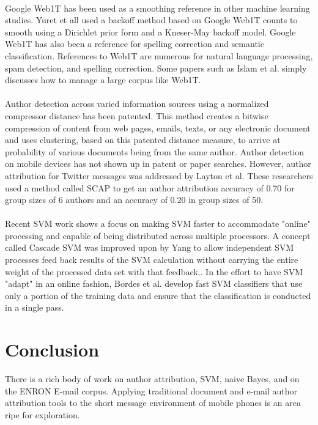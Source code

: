 	\paragraph{} Google Web1T has been used as a smoothing reference in other machine learning studies.  Yuret et all used a backoff method based on Google Web1T counts to smooth using a Dirichlet prior form and a Kneser-May backoff model.\cite{yuret_smoothing_2008} Google Web1T has also been a reference for spelling correction\cite{islam_real-word_2009} and semantic classification\cite{o_seaghdha_semantic_2008}.  References to Web1T are numerous for natural language processing, spam detection, and spelling correction.  Some papers such as Islam et al. simply discusses how to manage a large corpus like Web1T.\cite{islam_managing_2009}
	\paragraph{} Author detection across varied information sources using a normalized compressor distance has been patented.  This method creates a bitwise compression of content from web pages, emails, texts, or any electronic document and uses clustering, based on this patented distance measure, to arrive at probability of various  documents being from the same author.\cite{_method_????}  Author detection on mobile devices has not shown up in patent or paper searches.  However, author attribution for Twitter messages was addressed by Layton et al. These researchers used a method called SCAP to get an author attribution accuracy of 0.70 for group sizes of 6 authors and an accuracy of 0.20 in group sizes of 50.\cite{layton_authorship_2010}
	\paragraph{} Recent SVM work shows a focus on making SVM faster to accommodate "online" processing and capable of being distributed across multiple processors.  A concept called Cascade SVM was improved upon by Yang to allow independent SVM processes feed back results of the SVM calculation without carrying the entire weight of the processed data set with that feedback.\cite{yang_improved_2006}.  In the effort to have SVM "adapt" in an online fashion, Bordes et al. develop fast SVM classifiers that use only a portion of the training data and ensure that the classification is conducted in a single pass. \cite{bordes_fast_2005}

\section{Conclusion} There is a rich body of work on author attribution, SVM, naive Bayes, and on the ENRON E-mail corpus.  Applying traditional document and e-mail author attribution tools to the short message environment of mobile phones is an area ripe for exploration.




